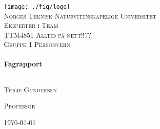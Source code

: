 \begin{titlepage}
 
\begin{center}
 
 
\texttt{[image: ./fig/logo]}\\[1cm]
 
\textsc{\LARGE Norges Teknisk-Naturvitenskapelige Universitet}\\[1.5cm]
 
\textsc{\large Eksperter i Team \\ TTM4851 Alltid på nett!!?? \\ Gruppe 1 Personvern}\\[0.5cm]
 
 
\HRule \\[0.4cm]
{ \huge \bfseries Fagrapport}\\[0.4cm]
 
\HRule \\[1.5cm]
 
\begin{minipage}{0.45\textwidth}
	\begin{flushleft} \large
		\textsc{Terje Gundersen}
	\end{flushleft}
\end{minipage}
\begin{minipage}{0.45\textwidth}
	\begin{flushright} \large
		\textsc{Professor}
	\end{flushright}
\end{minipage}
 
\vfill
 
{\large \today}
 
\end{center}
 
\end{titlepage}
